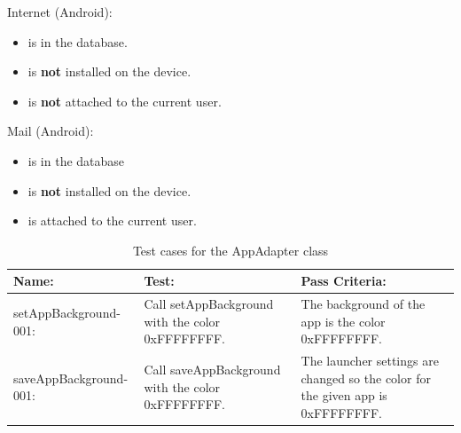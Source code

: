 Internet (Android):
\begin{itemize}
\item is in the database.
\item is \textbf{not} installed on the device.
\item is \textbf{not} attached to the current user.
\end{itemize}

Mail (Android):
\begin{itemize}
\item is in the database
\item is \textbf{not} installed on the device.
\item is attached to the current user.
\end{itemize}

\begin{table}[ht]
\caption{Test cases for the AppAdapter class} %
\centering  %
\begin{tabular}{| p{1.7in} | p{1.7in} | p{1.7in} |}
\hline
Name: & Test: & Pass Criteria: \\ [0.5ex] %
\hline                  %
setAppBackground-001: & Call setAppBackground with the color 0xFFFFFFFF. & The background of the app is the color 0xFFFFFFFF. \\ \hline 
saveAppBackground-001: & Call saveAppBackground with the color 0xFFFFFFFF. & The launcher settings are changed so the color for the given app is 0xFFFFFFFF. \\ [1ex]      %
\hline %
\end{tabular}
\label{table:appadapter_tests} %
\end{table}

